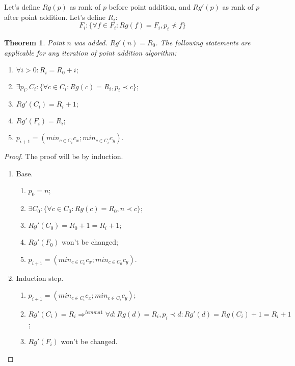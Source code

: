 \documentclass{article}
\newtheorem{th1}{Theorem}
\begin{document}
Let's define $Rg(p)$ as rank of $p$ before point addition, and $Rg'(p)$ as rank
of $p$ after point addition.
Let's define $R_i$:
$$ F_i: \{\forall f \in F_i: Rg(f) = F_i, p_i \not \prec f \}$$

\begin{th1}\label{th1}
Point $n$ was added. $Rg'(n) = R_0$.
The following statements are applicable for any iteration of point addition
algorithm:
\begin{enumerate}
  \item $ \forall i > 0 : R_i = R_0 + i;$
  \item $ \exists p_i, C_i: \{\forall c \in C_i: Rg(c) = R_i, p_i \prec c \};$
  \item $ Rg'(C_i) = R_i + 1;$
  \item $ Rg'(F_i) = R_i;$
  \item $ p_{i+1} = (min_{c \in C_i} c_x; min_{c \in C_i} c_y).$
\end{enumerate}
\end{th1}
\begin{proof}
The proof will be by induction.
\begin{enumerate}
  \item Base.
  \begin{enumerate}
  	\item $p_0 = n;$
  	\item $\exists C_0: \{\forall c \in C_0: Rg(c) = R_0, n \prec c \};$
  	\item $Rg'(C_0) = R_0 + 1 = R_i + 1;$
  	\item $Rg'(F_0)$ won't be changed;
  	\item $p_{i + 1} = (min_{c \in C_0} c_x; min_{c \in C_0} c_y).$
  \end{enumerate}
  \item Induction step.
  \begin{enumerate}
  	\item $ p_{i+1} = (min_{c \in C_i} c_x; min_{c \in C_i} c_y);$
  	\item $ Rg'(C_i) = R_i \Rightarrow^{lemma1} \forall {d: Rg(d) = R_i, p_i
  	\prec d: Rg'(d) = Rg(C_i) + 1 = R_i + 1}$;
  	\item $Rg'(F_i)$ won't be changed.
  \end{enumerate}
\end{enumerate}
\end{proof}
\end{document}
